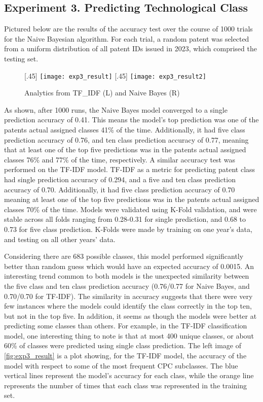\documentclass{article}
\begin{document}
\subsection{Experiment 3. Predicting Technological Class}
Pictured below are the results of the accuracy test over the course of 1000 trials for the Naive Bayesian algorithm.  For each trial, a random patent was selected from a uniform distribution of all patent IDs issued in 2023, which comprised the testing set.

\begin{figure}[ht]
  [.45\linewidth]{%
    \texttt{[image: exp3\_result]}%
  }%
  \hfill
  [.45\linewidth]{%
    \texttt{[image: exp3\_result2]}%
  }
  \caption{Analytics from TF\_IDF (L) and Naive Bayes (R)}
  \label{fig:exp3_result}
\end{figure}


As shown, after 1000 runs, the Naive Bayes model converged to a single prediction accuracy of 0.41.  This means the model’s top prediction was one of the patents actual assigned classes 41\% of the time. Additionally, it had five class prediction accuracy of 0.76, and ten class prediction accuracy of 0.77, meaning that at least one of the top five predictions was in the patents actual assigned classes 76\% and 77\% of the time, respectively.  A similar accuracy test was performed on the TF-IDF model.  TF-IDF as a metric for predicting patent class had single prediction accuracy of 0.294, and a five and ten class prediction accuracy of 0.70. Additionally, it had five class prediction accuracy of 0.70 meaning at least one of the top five predictions was in the patents actual assigned classes 70\% of the time. Models were validated using K-Fold validation, and were stable across all folds ranging from 0.28-0.31 for single prediction, and 0.68 to 0.73 for five class prediction. K-Folds were made by training on one year's data, and testing on all other years' data. 

Considering there are 683 possible classes, this model performed significantly better than random guess which would have an expected accuracy of 0.0015. An interesting trend common to both models is the unexpected similarity between the five class and ten class prediction accuracy (0.76/0.77 for Naive Bayes, and 0.70/0.70 for TF-IDF).  The similarity in accuracy suggests that there were very few instances where the models could identify the class correctly in the top ten, but not in the top five. In addition, it seems as though the models were better at predicting some classes than others.   For example, in the TF-IDF classification model, one interesting thing to note is that at most 400 unique classes, or about 60\% of classes were predicted using single class prediction. The left image of \autoref{fig:exp3_result} is a plot showing, for the TF-IDF model, the accuracy of the model with respect to some of the most frequent CPC subclasses.  The blue vertical lines represent the model’s accuracy for each class, while the orange line represents the number of times that each class was represented in the training set. 
\end{document}
